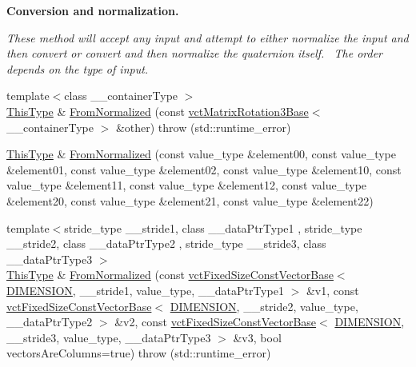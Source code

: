 \begin{Indent}{\bf Conversion and normalization.}\par
{\em These method will accept any input and attempt to either normalize the input and then convert or convert and then normalize the quaternion itself.~\newline
The order depends on the type of input. }\begin{DoxyCompactItemize}
\item 
{\footnotesize template$<$class \+\_\+\+\_\+container\+Type $>$ }\\\hyperlink{classvct_matrix_rotation3_base_a027be766cb10ca3c2ad8e85c28ed0af9}{This\+Type} \& \hyperlink{classvct_matrix_rotation3_base_a310d37178d973b7401402980505b5712}{From\+Normalized} (const \hyperlink{classvct_matrix_rotation3_base}{vct\+Matrix\+Rotation3\+Base}$<$ \+\_\+\+\_\+container\+Type $>$ \&other)  throw (std\+::runtime\+\_\+error)
\item 
\hyperlink{classvct_matrix_rotation3_base_a027be766cb10ca3c2ad8e85c28ed0af9}{This\+Type} \& \hyperlink{classvct_matrix_rotation3_base_ab970705d12cfdd0293630afae6190e6f}{From\+Normalized} (const value\+\_\+type \&element00, const value\+\_\+type \&element01, const value\+\_\+type \&element02, const value\+\_\+type \&element10, const value\+\_\+type \&element11, const value\+\_\+type \&element12, const value\+\_\+type \&element20, const value\+\_\+type \&element21, const value\+\_\+type \&element22)
\item 
{\footnotesize template$<$stride\+\_\+type \+\_\+\+\_\+stride1, class \+\_\+\+\_\+data\+Ptr\+Type1 , stride\+\_\+type \+\_\+\+\_\+stride2, class \+\_\+\+\_\+data\+Ptr\+Type2 , stride\+\_\+type \+\_\+\+\_\+stride3, class \+\_\+\+\_\+data\+Ptr\+Type3 $>$ }\\\hyperlink{classvct_matrix_rotation3_base_a027be766cb10ca3c2ad8e85c28ed0af9}{This\+Type} \& \hyperlink{classvct_matrix_rotation3_base_a1bf7b37eb0d22dab699130ede5c32506}{From\+Normalized} (const \hyperlink{classvct_fixed_size_const_vector_base}{vct\+Fixed\+Size\+Const\+Vector\+Base}$<$ \hyperlink{classvct_matrix_rotation3_base_a97514c086bdd3a691714817775b02f21a43f9b5ba9769ee62eadd8398853504cd}{D\+I\+M\+E\+N\+S\+I\+O\+N}, \+\_\+\+\_\+stride1, value\+\_\+type, \+\_\+\+\_\+data\+Ptr\+Type1 $>$ \&v1, const \hyperlink{classvct_fixed_size_const_vector_base}{vct\+Fixed\+Size\+Const\+Vector\+Base}$<$ \hyperlink{classvct_matrix_rotation3_base_a97514c086bdd3a691714817775b02f21a43f9b5ba9769ee62eadd8398853504cd}{D\+I\+M\+E\+N\+S\+I\+O\+N}, \+\_\+\+\_\+stride2, value\+\_\+type, \+\_\+\+\_\+data\+Ptr\+Type2 $>$ \&v2, const \hyperlink{classvct_fixed_size_const_vector_base}{vct\+Fixed\+Size\+Const\+Vector\+Base}$<$ \hyperlink{classvct_matrix_rotation3_base_a97514c086bdd3a691714817775b02f21a43f9b5ba9769ee62eadd8398853504cd}{D\+I\+M\+E\+N\+S\+I\+O\+N}, \+\_\+\+\_\+stride3, value\+\_\+type, \+\_\+\+\_\+data\+Ptr\+Type3 $>$ \&v3, bool vectors\+Are\+Columns=true)  throw (std\+::runtime\+\_\+error)

\end{DoxyCompactItemize}
\end{Indent}

